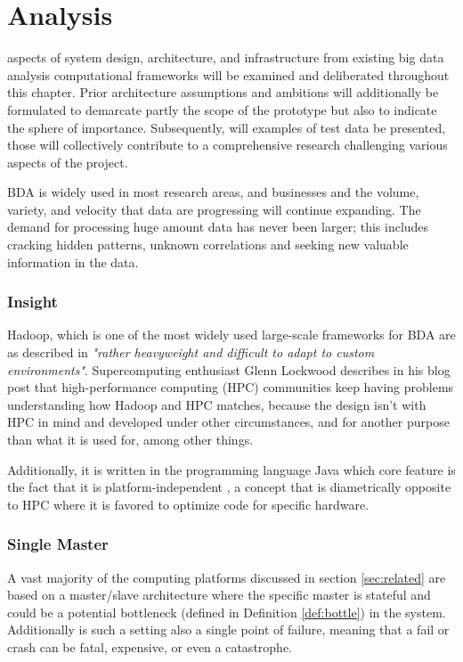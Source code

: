 \chapter{Analysis}

 aspects of system design, architecture, and infrastructure from existing big data analysis computational frameworks will be examined and deliberated throughout this chapter. Prior architecture assumptions and ambitions will additionally be formulated to demarcate partly the scope of the prototype but also to indicate the sphere of importance. Subsequently, will examples of test data be presented, those will collectively contribute to a comprehensive research challenging various aspects of the project.
\newline

BDA is widely used in most research areas, and businesses and the volume, variety, and velocity that data are progressing will continue expanding. The demand for processing huge amount data has never been larger; this includes \eg cracking hidden patterns, unknown correlations and seeking new valuable information in the data.
\newline

\subsection*{Insight}
Hadoop, which is one of the most widely used large-scale frameworks for BDA are as described in \cite{Mundkur:2011:DCP:2034654.2034670} \textit{"rather heavyweight and difficult to adapt to custom environments"}. Supercomputing enthusiast Glenn Lockwood describes in his blog post \cite{PageLockwoodHadoop} that high-performance computing (HPC) communities keep having problems understanding how Hadoop and HPC matches, because the design isn't with HPC in mind and developed under other circumstances, and for another purpose than what it is used for, among other things. 

Additionally, it is written in the programming language Java which core feature is the fact that it is platform-independent \cite{PageJava}, \ie a concept that is diametrically opposite to HPC where it is favored to optimize code for specific hardware.

\subsection*{Single Master}
A vast majority of the computing platforms discussed in section \ref{sec:related} are based on a master/slave architecture where the specific master is stateful and could be a potential bottleneck (defined in Definition \ref{def:bottle}) in the system. Additionally is such a setting also a single point of failure, meaning that a fail or crash can be fatal, expensive, or even a catastrophe.
\newline


